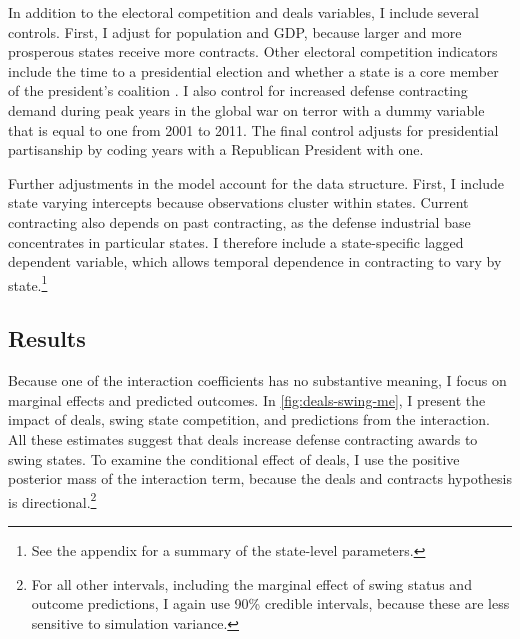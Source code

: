 \documentclass[12pt]{article}
\begin{document}
In addition to the electoral competition and deals variables, I include several controls. 
First, I adjust for population and GDP, because larger and more prosperous states receive more contracts. 
Other electoral competition indicators include the time to a presidential election and whether a state is a core member of the president's coalition \citep{KrinerReeves2015}. 
I also control for increased defense contracting demand during peak years in the global war on terror with a dummy variable that is equal to one from 2001 to 2011. 
The final control adjusts for presidential partisanship by coding years with a Republican President with one. 


Further adjustments in the model account for the data structure.
First, I include state varying intercepts because observations cluster within states. 
Current contracting also depends on past contracting, as the defense industrial base concentrates in particular states. 
I therefore include a state-specific lagged dependent variable, which allows temporal dependence in contracting to vary by state.\footnote{See the appendix for a summary of the state-level parameters.}






\subsection{Results}


Because one of the interaction coefficients has no substantive meaning, I focus on marginal effects and predicted outcomes.
In \autoref{fig:deals-swing-me}, I present the impact of deals, swing state competition, and predictions from the interaction.
All these estimates suggest that deals increase defense contracting awards to swing states. 
To examine the conditional effect of deals, I use the positive posterior mass of the interaction term, because the deals and contracts hypothesis is directional.\footnote{For all other intervals, including the marginal effect of swing status and outcome predictions, I again use 90\% credible intervals, because these are less sensitive to simulation variance.}
\end{document}
